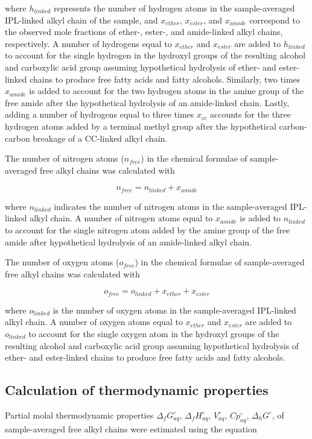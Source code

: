 \noindent where $h_{linked}$ represents the number of hydrogen atoms in the sample-averaged IPL-linked alkyl chain of the sample, and $x_{ether}$, $x_{ester}$, and $x_{amide}$ correspond to the observed mole fractions of ether-, ester-, and amide-linked alkyl chains, respectively. A number of hydrogens equal to $x_{ether}$ and $x_{ester}$ are added to $h_{linked}$ to account for the single hydrogen in the hydroxyl groups of the resulting alcohol and carboxylic acid group assuming hypothetical hydrolysis of ether- and ester-linked chains to produce free fatty acids and fatty alcohols. Similarly, two times $x_{amide}$ is added to account for the two hydrogen atoms in the amine group of the free amide after the hypothetical hydrolysis of an amide-linked chain. Lastly, adding a number of hydrogens equal to three times $x_{cc}$ accounts for the three hydrogen atoms added by a terminal methyl group after the hypothetical carbon-carbon breakage of a CC-linked alkyl chain.

The number of nitrogen atoms ($n_{free}$) in the chemical formulae of sample-averaged free alkyl chains was calculated with

\begin{equation}
    n_{free} = n_{linked} + x_{amide}
\end{equation}

\noindent where $n_{linked}$ indicates the number of nitrogen atoms in the sample-averaged IPL-linked alkyl chain. A number of nitrogen atoms equal to $x_{amide}$ is added to $n_{linked}$ to account for the single nitrogen atom added by the amine group of the free amide after hypothetical hydrolysis of an amide-linked alkyl chain.

The number of oxygen atoms ($o_{free}$) in the chemical formulae of sample-averaged free alkyl chains was calculated with

\begin{equation}
    o_{free} = o_{linked} + x_{ether} + x_{ester}
\end{equation}

\noindent where $o_{linked}$ is the number of oxygen atoms in the sample-averaged IPL-linked alkyl chain. A number of oxygen atoms equal to $x_{ether}$ and $x_{ester}$ are added to $o_{linked}$ to account for the single oxygen atom in the hydroxyl groups of the resulting alcohol and carboxylic acid group assuming hypothetical hydrolysis of ether- and ester-linked chains to produce free fatty acids and fatty alcohols.

\subsection{Calculation of thermodynamic properties}
Partial molal thermodynamic properties $\Delta_{f}G_{aq}^{\circ}$, $\Delta_{f}H_{aq}^{\circ}$, $V_{aq}^{\circ}$, $Cp_{aq}^{\circ}$, $\Delta_{h}G^{\circ}$, of sample-averaged free alkyl chains were estimated using the equation

